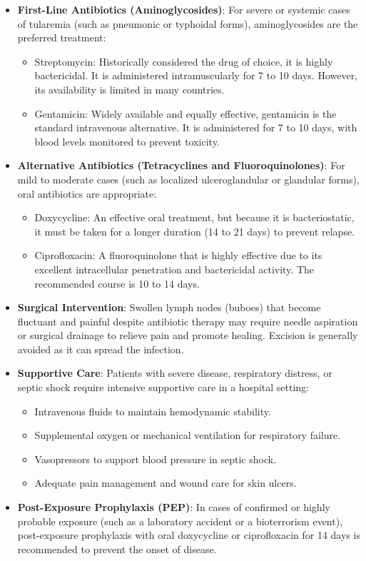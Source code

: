 \begin{itemize}
    \item \textbf{First-Line Antibiotics (Aminoglycosides)}: For severe or systemic cases of tularemia (such as pneumonic or typhoidal forms), aminoglycosides are the preferred treatment:
    \begin{itemize}
        \item Streptomycin: Historically considered the drug of choice, it is highly bactericidal. It is administered intramuscularly for 7 to 10 days. However, its availability is limited in many countries.
        \item Gentamicin: Widely available and equally effective, gentamicin is the standard intravenous alternative. It is administered for 7 to 10 days, with blood levels monitored to prevent toxicity.
    \end{itemize}
    \item \textbf{Alternative Antibiotics (Tetracyclines and Fluoroquinolones)}: For mild to moderate cases (such as localized ulceroglandular or glandular forms), oral antibiotics are appropriate:
    \begin{itemize}
        \item Doxycycline: An effective oral treatment, but because it is bacteriostatic, it must be taken for a longer duration (14 to 21 days) to prevent relapse.
        \item Ciprofloxacin: A fluoroquinolone that is highly effective due to its excellent intracellular penetration and bactericidal activity. The recommended course is 10 to 14 days.
    \end{itemize}
    \item \textbf{Surgical Intervention}: Swollen lymph nodes (buboes) that become fluctuant and painful despite antibiotic therapy may require needle aspiration or surgical drainage to relieve pain and promote healing. Excision is generally avoided as it can spread the infection.
    \item \textbf{Supportive Care}: Patients with severe disease, respiratory distress, or septic shock require intensive supportive care in a hospital setting:
    \begin{itemize}
        \item Intravenous fluids to maintain hemodynamic stability.
        \item Supplemental oxygen or mechanical ventilation for respiratory failure.
        \item Vasopressors to support blood pressure in septic shock.
        \item Adequate pain management and wound care for skin ulcers.
    \end{itemize}
    \item \textbf{Post-Exposure Prophylaxis (PEP)}: In cases of confirmed or highly probable exposure (such as a laboratory accident or a bioterrorism event), post-exposure prophylaxis with oral doxycycline or ciprofloxacin for 14 days is recommended to prevent the onset of disease.
\end{itemize}

